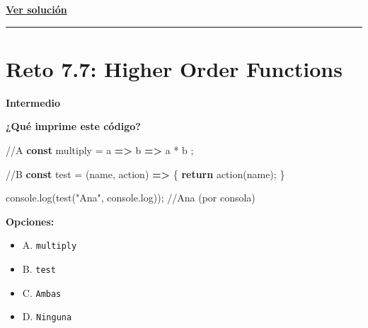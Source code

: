 \documentclass[
  letterpaper,
  DIV=11,
  numbers=noendperiod]{scrreprt}
\newenvironment{Shaded}{\begin{snugshade}}{\end{snugshade}}
\newcommand{\BuiltInTok}[1]{\textcolor[rgb]{0.00,0.23,0.31}{#1}}
\newcommand{\CommentTok}[1]{\textcolor[rgb]{0.37,0.37,0.37}{#1}}
\newcommand{\ControlFlowTok}[1]{\textcolor[rgb]{0.00,0.23,0.31}{\textbf{#1}}}
\newcommand{\FunctionTok}[1]{\textcolor[rgb]{0.28,0.35,0.67}{#1}}
\newcommand{\KeywordTok}[1]{\textcolor[rgb]{0.00,0.23,0.31}{\textbf{#1}}}
\newcommand{\NormalTok}[1]{\textcolor[rgb]{0.00,0.23,0.31}{#1}}
\newcommand{\OperatorTok}[1]{\textcolor[rgb]{0.37,0.37,0.37}{#1}}
\newcommand{\StringTok}[1]{\textcolor[rgb]{0.13,0.47,0.30}{#1}}
\providecommand{\tightlist}{%
  \setlength{\itemsep}{0pt}\setlength{\parskip}{0pt}}
\begin{document}
\textbf{\hyperref[sec-sol-cap7-reto6]{Ver solución}}

\begin{center}\rule{0.5\linewidth}{0.5pt}\end{center}

\section{Reto 7.7: Higher Order Functions}\label{sec-cap7-reto7}

\begin{tcolorbox}[enhanced jigsaw, left=2mm, toprule=.15mm, leftrule=.75mm, breakable, colback=white, coltitle=black, bottomtitle=1mm, arc=.35mm, rightrule=.15mm, colframe=quarto-callout-caution-color-frame, opacitybacktitle=0.6, toptitle=1mm, opacityback=0, titlerule=0mm, title=\textcolor{quarto-callout-caution-color}{\faFire}\hspace{0.5em}{Dificultad}, bottomrule=.15mm, colbacktitle=quarto-callout-caution-color!10!white]

\textbf{Intermedio}

\end{tcolorbox}

\textbf{¿Qué imprime este código?}

\begin{Shaded}
\begin{Highlighting}[]
\CommentTok{//A}
\KeywordTok{const}\NormalTok{ multiply }\OperatorTok{=}\NormalTok{ a }\KeywordTok{=\textgreater{}}\NormalTok{ b }\KeywordTok{=\textgreater{}}\NormalTok{ a }\OperatorTok{*}\NormalTok{ b }\OperatorTok{;}

\CommentTok{//B}
\KeywordTok{const}\NormalTok{ test }\OperatorTok{=}\NormalTok{ (name}\OperatorTok{,}\NormalTok{ action) }\KeywordTok{=\textgreater{}}\NormalTok{ \{}
  \ControlFlowTok{return} \FunctionTok{action}\NormalTok{(name)}\OperatorTok{;} 
\NormalTok{\}}

\BuiltInTok{console}\OperatorTok{.}\FunctionTok{log}\NormalTok{(}\FunctionTok{test}\NormalTok{(}\StringTok{"Ana"}\OperatorTok{,} \BuiltInTok{console}\OperatorTok{.}\FunctionTok{log}\NormalTok{))}\OperatorTok{;} 
\CommentTok{//Ana (por consola)}
\end{Highlighting}
\end{Shaded}

\textbf{Opciones:}

\begin{itemize}
\tightlist
\item
  A. \texttt{multiply}
\item
  B. \texttt{test}
\item
  C. \texttt{Ambas}
\item
  D. \texttt{Ninguna}
\end{itemize}
\end{document}
